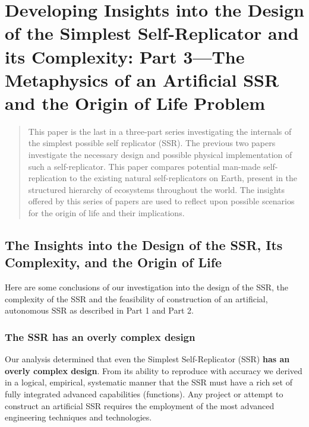 \chapter[The Simplest Self-Replicator, Part 3]{Developing Insights into the Design of the Simplest Self-Replicator and its Complexity: Part 3---The Metaphysics of an Artificial SSR and the Origin of Life Problem}


\begin{abstract}
This paper is the last in a three-part series investigating the internals 
of the simplest possible self replicator (SSR).  
The previous two papers
investigate the necessary design and possible physical implementation of 
such a self-replicator.
This paper compares potential man-made self-replication
to the existing natural self-replicators on Earth, present in the 
structured hierarchy of ecosystems throughout the world.
The insights offered by this series of papers are used to
reflect upon possible scenarios for the origin of life and their implications.
\end{abstract}


\section[Insights into the Design]{The Insights into the Design of the SSR, Its Complexity, and the Origin of Life}

Here are some conclusions of our investigation into the design of the
SSR, the complexity of the SSR and the feasibility of construction of
an artificial, autonomous SSR as described in Part 1 and Part 2.

\subsection{The SSR has an overly complex design}

Our analysis determined that even the Simplest Self-Replicator (SSR)
\textbf{has an overly complex design}. From its ability to reproduce
with accuracy we derived in a logical, empirical, systematic manner
that the SSR must have a rich set of fully integrated advanced
capabilities (functions).  Any project or attempt to construct an
artificial SSR requires the employment of the most advanced engineering
techniques and technologies.

